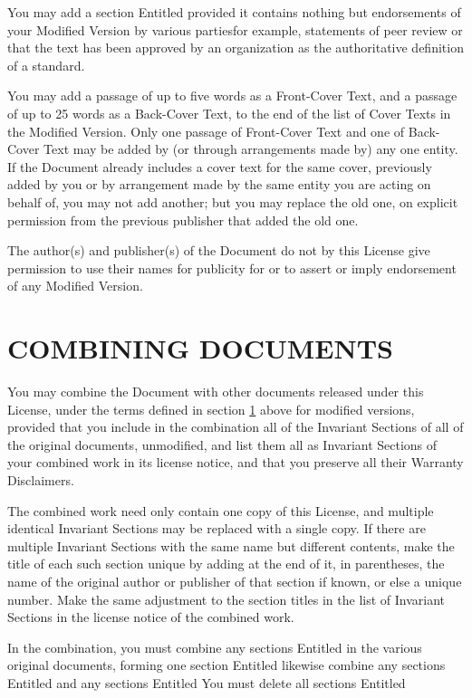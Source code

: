 You may add a section Entitled  provided
it contains nothing but endorsements of your Modified Version
by various parties\textemdash for example, statements of peer review
or that the text has been approved by an organization as the
authoritative definition of a standard.

You may add a passage of up to five words as a Front-Cover
Text, and a passage of up to 25 words as a Back-Cover Text,
to the end of the list of Cover Texts in the Modified
Version. Only one passage of Front-Cover Text and one of
Back-Cover Text may be added by (or through arrangements
made by) any one entity. If the Document already includes a
cover text for the same cover, previously added by you or by
arrangement made by the same entity you are acting on behalf
of, you may not add another; but you may replace the old one,
on explicit permission from the previous publisher that added
the old one.

The author(s) and publisher(s) of the Document do not by this
License give permission to use their names for publicity for
or to assert or imply endorsement of any Modified Version.

\section{COMBINING DOCUMENTS}
\label{gnu:combiningdocuments}
You may combine the Document with other documents released
under this License, under the terms defined in section \ref{gnu:combiningdocuments}
above for modified versions, provided that you include in
the combination all of the Invariant Sections of all of the
original documents, unmodified, and list them all as Invariant
Sections of your combined work in its license notice, and
that you preserve all their Warranty Disclaimers.

The combined work need only contain one copy of this License,
and multiple identical Invariant Sections may be replaced with
a single copy. If there are multiple Invariant Sections with
the same name but different contents, make the title of each
such section unique by adding at the end of it, in parentheses,
the name of the original author or publisher of that section
if known, or else a unique number. Make the same adjustment
to the section titles in the list of Invariant Sections in
the license notice of the combined work.

In the combination, you must combine any sections Entitled
 in the various original documents, forming
one section Entitled  likewise combine any
sections Entitled  and any sections
Entitled  You must delete all sections
Entitled 

